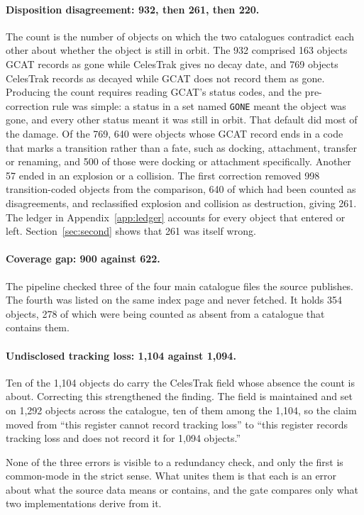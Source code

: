 \paragraph{Disposition disagreement: 932, then 261, then 220.}
The count is the number of objects on which the two catalogues contradict each
other about whether the object is still in orbit. The 932 comprised 163 objects
GCAT records as gone while CelesTrak gives no decay date, and 769 objects
CelesTrak records as decayed while GCAT does not record them as gone. Producing
the count requires reading GCAT's status codes, and the pre-correction rule was
simple: a status in a set named \texttt{GONE} meant the object was gone, and
every other status meant it was still in orbit. That default did most of the
damage. Of the 769, 640 were objects whose GCAT record ends in a code that marks
a transition rather than a fate, such as docking, attachment, transfer or
renaming, and 500 of those were docking or attachment specifically. Another 57
ended in an explosion or a collision. The first correction removed 998
transition-coded objects from the comparison, 640 of which had been counted as
disagreements, and reclassified explosion and collision as destruction, giving
261. The ledger in Appendix~\ref{app:ledger} accounts for every object that
entered or left. Section~\ref{sec:second} shows that 261 was itself wrong.

\paragraph{Coverage gap: 900 against 622.}
The pipeline checked three of the four main catalogue files the source
publishes. The fourth was listed on the same index page and never fetched. It
holds 354 objects, 278 of which were being counted as absent from a catalogue
that contains them.

\paragraph{Undisclosed tracking loss: 1,104 against 1,094.}
Ten of the 1,104 objects do carry the CelesTrak field whose absence the count
is about. Correcting this strengthened the finding. The field is maintained and
set on 1,292 objects across the catalogue, ten of them among the 1,104, so the
claim moved from ``this register cannot record tracking loss'' to ``this
register records tracking loss and does not record it for 1,094 objects.''

None of the three errors is visible to a redundancy check, and only the first is
common-mode in the strict sense. What unites them is that each is an error about
what the source data means or contains, and the gate compares only what two
implementations derive from it.
